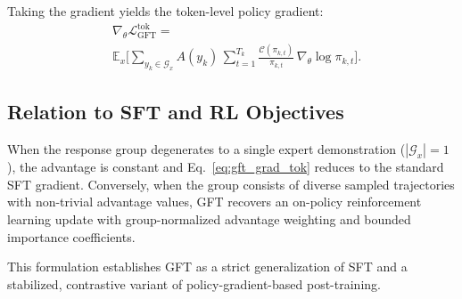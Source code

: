 Taking the gradient yields the token-level policy gradient:
\begin{equation}
\begin{split}
& \nabla_\theta \mathcal{L}_{\mathrm{GFT}}^{\mathrm{tok}}
= %
\\
& \mathbb{E}_{x} %
\Bigg[
\sum_{y_k \in \mathcal{G}_x}
A(y_k)\,
\sum_{t=1}^{T_k}
\frac{\mathcal{C}(\pi_{k,t})}{\pi_{k,t}}\,
\nabla_\theta
\log \pi_{k,t}
\Bigg].
\end{split}
\label{eq:gft_grad_tok}
\end{equation}

\subsection{Relation to SFT and RL Objectives}
\label{subsec:relation_sft_rl}

When the response group degenerates to a single expert demonstration (\(|\mathcal{G}_x| = 1\)), the advantage is constant and Eq.~\eqref{eq:gft_grad_tok} reduces to the standard SFT gradient. Conversely, when the group consists of diverse sampled trajectories with non-trivial advantage values, GFT recovers an on-policy reinforcement learning update with group-normalized advantage weighting and bounded importance coefficients.

This formulation establishes GFT as a strict generalization of SFT and a stabilized, contrastive variant of policy-gradient-based post-training.



    
            
